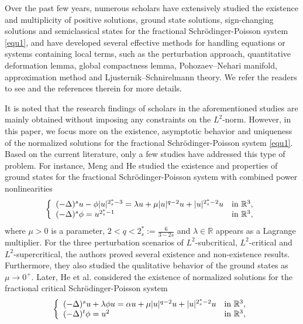 \documentclass[reqno, 11pt]{amsart} %
\numberwithin{equation}{section}
\begin{document}
	Over the past few years, numerous scholars have extensively studied the existence and multiplicity of positive solutions, ground state solutions, sign-changing solutions and semiclassical states for the fractional Schr\"{o}dinger-Poisson system \eqref{equ1}, and have developed several effective methods for handling equations or systems containing local terms, such as the perturbation approach, quantitative deformation lemma, global compactness lemma, Pohozaev–Nehari manifold, approximation method and Ljusternik–Schnirelmann theory. We refer the readers to see \cite{DH,JC,MM,TTT,TTTT,TZ} and the references therein for more details. 
	
	It is noted that the research findings of scholars in the aforementioned studies are mainly obtained without imposing any constraints on the $L^{2}$-norm. However, in this paper, we focus more on the existence, asymptotic behavior and uniqueness of the normalized solutions for the fractional Schr\"{o}dinger-Poisson system \eqref{equ1}. Based on the current literature, only a few studies have addressed this type of problem. For instance, Meng and He \cite{MHCV} studied the existence and properties of ground states for the fractional
	Schr\"{o}dinger-Poisson system with combined power nonlinearities
	\begin{equation*}
		\left\{
		\begin{array}{ll}
			(-\Delta)^{s}u-\phi |u|^{2_{s}^{\ast}-3}=\lambda u+\mu |u|^{q-2}u+|u|^{2_{s}^{\ast}-2}u& \hbox{in $\mathbb{R}^{3}$},\\
			(-\Delta)^{s}\phi=u^{2_{s}^{\ast}-1}& \hbox{in $\mathbb{R}^{3}$},
		\end{array}
		\right.
	\end{equation*}
	where $\mu >0$ is a parameter, $2<q<2_{s}^{\ast}:=\frac{6}{3-2s}$ and $\lambda\in \mathbb{R}$ appears as a Lagrange multiplier. For the three perturbation scenarios of $L^{2}$-subcritical, $L^{2}$-critical and $L^{2}$-supercritical, the authors  proved several existence and non-existence results. Furthermore, they also studied the qualitative behavior of the ground states as $\mu\rightarrow0^{+}$. Later, He et al. \cite{HCV,HJGA} considered the existence of normalized solutions for the fractional critical Schr\"{o}dinger-Poisson system
	\begin{equation*}
		\left\{
		\begin{array}{ll}
			(-\Delta)^{s}u+\lambda\phi u=\alpha u+\mu |u|^{q-2}u+|u|^{2_{s}^{\ast}-2}u& \hbox{in $\mathbb{R}^{3}$},\\
			(-\Delta)^{t}\phi=u^{2}& \hbox{in $\mathbb{R}^{3}$},
		\end{array}
		\right.
	\end{equation*}
\end{document}

